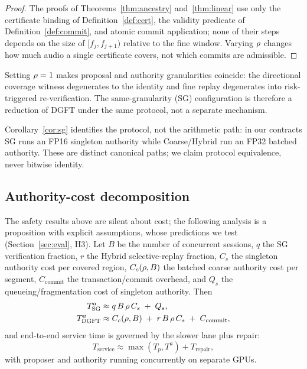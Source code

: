 \begin{proof}
The proofs of Theorems~\ref{thm:ancestry} and~\ref{thm:linear} use only the
certificate binding of Definition~\ref{def:cert}, the validity predicate of
Definition~\ref{def:commit}, and atomic commit application; none of their
steps depends on the size of $[f_j,f_{j+1})$ relative to the fine window.
Varying $\rho$ changes how much audio a single certificate covers,
not which commits are admissible.
\end{proof}

\begin{corollary}[Same-granularity certification as $\granratio=1$]\label{cor:sg}
Setting $\granratio = 1$ makes proposal and authority granularities
coincide: the directional coverage witness degenerates to the identity and
fine replay degenerates into risk-triggered re-verification. The
same-granularity (SG) configuration is therefore a reduction of DGFT under
the same protocol, not a separate mechanism.
\end{corollary}

\begin{remark}\label{rem:canonical}
Corollary~\ref{cor:sg} identifies the protocol, not the arithmetic path: in
our contracts SG runs an FP16 singleton authority while Coarse/Hybrid run an
FP32 batched authority. These are distinct canonical paths; we claim
protocol equivalence, never bitwise identity.
\end{remark}

\subsection{Authority-cost decomposition}\label{sec:dgft:cost}

The safety results above are silent about cost; the following analysis is a
proposition with explicit assumptions, whose predictions we test
(Section~\ref{sec:eval}, H3). Let $B$ be the number of concurrent sessions,
$q$ the SG verification fraction, $r$ the Hybrid selective-replay fraction,
$C_s$ the singleton authority cost per covered region, $C_c(\rho,B)$
the batched coarse authority cost per segment, $C_{\mathrm{commit}}$ the
transaction/commit overhead, and $Q_s$ the queueing/fragmentation cost of
singleton authority. Then
\begin{align}
  T_{\mathrm{SG}}^{a} &\approx q\,B\,\rho\,C_s \;+\; Q_s, \label{eq:cost-sg}\\
  T_{\mathrm{DGFT}}^{a} &\approx C_c(\rho,B) \;+\;
    r\,B\,\rho\,C_s \;+\; C_{\mathrm{commit}}, \label{eq:cost-dgft}
\end{align}
and end-to-end service time is governed by the slower lane plus repair:
\begin{equation}\label{eq:cost-service}
  T_{\mathrm{service}} \approx \max(T_p, T^{a}) + T_{\mathrm{repair}},
\end{equation}
with proposer and authority running concurrently on separate GPUs.

